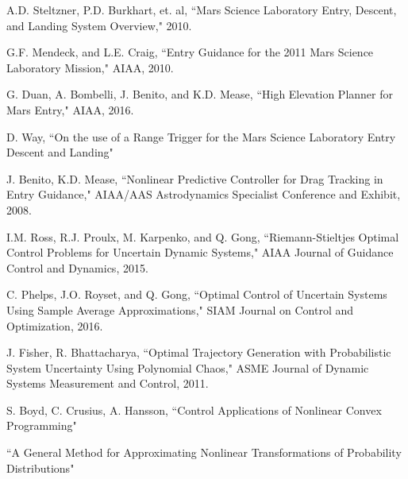 \documentclass[10pt,a4paper]{article}
\begin{document}
	
	\begin{thebibliography}{1}
		

		A.D. Steltzner, P.D. Burkhart, et. al, ``Mars Science Laboratory Entry, Descent, and Landing System Overview," 2010.
				
		G.F. Mendeck, and L.E. Craig, ``Entry Guidance for the 2011 Mars Science Laboratory Mission," AIAA, 2010.
		
		G. Duan, A. Bombelli, J. Benito, and K.D. Mease, ``High Elevation Planner for Mars Entry," AIAA, 2016.
		
		D. Way, ``On the use of a Range Trigger for the Mars Science Laboratory Entry Descent and Landing"
		
		J. Benito, K.D. Mease, ``Nonlinear Predictive Controller for Drag Tracking in Entry Guidance," AIAA/AAS Astrodynamics Specialist Conference and Exhibit, 2008.
		
		I.M. Ross, R.J. Proulx, M. Karpenko, and Q. Gong, ``Riemann-Stieltjes Optimal Control Problems for Uncertain Dynamic Systems," AIAA Journal of Guidance Control and Dynamics, 2015.
		
		C. Phelps, J.O. Royset, and Q. Gong, ``Optimal Control of Uncertain Systems Using Sample Average Approximations," SIAM Journal on Control and Optimization, 2016.
		
		J. Fisher, R. Bhattacharya, ``Optimal Trajectory Generation with Probabilistic System Uncertainty Using Polynomial Chaos," ASME Journal of Dynamic Systems Measurement and Control, 2011.
		
		S. Boyd, C. Crusius, A. Hansson, ``Control Applications of Nonlinear Convex Programming"
		
		``A General Method for Approximating Nonlinear Transformations of Probability Distributions"
		
		
	\end{thebibliography}
\end{document}
